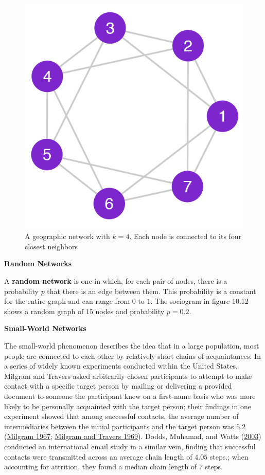\documentclass{book}
\begin{document}
\begin{figure}
\centering
\includegraphics{images/social-networks/11-11.png}
\caption{A geographic network with \(k = 4\). Each node is connected to its
four closest neighbors}
\end{figure}

\textbf{Random Networks}

A \textbf{random network} is one in which, for each pair of nodes, there is a
probability \(p\) that there is an edge between them. This probability is a
constant for the entire graph and can range from \(0\) to \(1\). The sociogram
in figure 10.12 shows a random graph of \(15\) nodes and probability
\(p = 0.2\).

\textbf{Small-World Networks}

The small-world phenomenon describes the idea that in a large population, most
people are connected to each other by relatively short chains of
acquaintances. In a series of widely known experiments conducted within the
United States, Milgram and Travers asked arbitrarily chosen participants to
attempt to make contact with a specific target person by mailing or delivering
a provided document to someone the participant knew on a first-name basis who
was more likely to be personally acquainted with the target person; their
findings in one experiment showed that among successful contacts, the average
number of intermediaries between the initial participants and the target
person was \(5.2\) (\protect\hyperlink{ref-Milgram1967}{Milgram 1967};
\protect\hyperlink{ref-MilgramTravers1969}{Milgram and Travers 1969}). Dodds,
Muhamad, and Watts (\protect\hyperlink{ref-DoddsEtAl2003}{2003}) conducted an
international email study in a similar vein, finding that successful contacts
were transmitted across an average chain length of \(4.05\) steps.; when
accounting for attrition, they found a median chain length of \(7\) steps.
\end{document}
